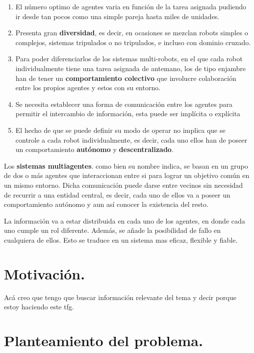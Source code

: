 \begin{enumerate}
	\item El número optimo de agentes varia en función de la tarea asignada pudiendo ir desde tan pocos como una simple pareja hasta miles de unidades.
	\item Presenta gran \textbf{diversidad}, es decir, en ocasiones se mezclan robots simples o complejos, sistemas tripulados o no tripulados, e incluso con dominio cruzado.
	\item Para poder diferenciarlos de los sistemas multi-robots, en el que cada robot individualmente tiene una tarea asignada de antemano, los de tipo enjambre han de tener un \textbf{comportamiento colectivo} que involucre colaboración entre los propios agentes y estos con su entorno.
	\item Se necesita establecer una forma de comunicación entre los agentes para permitir el intercambio de información, esta puede ser implícita o explícita
	\item El hecho de que se puede definir su modo de operar no implica que se controle a cada robot individualmente, es decir, cada uno ellos han de poseer un comportamiento \textbf{autónomo} y \textbf{descentralizado}.
\end{enumerate}

Los \textbf{sistemas multiagentes}. como bien su nombre indica, se basan en un grupo de dos o más agentes que interaccionan entre si para lograr un objetivo común en un mismo entorno. Dicha comunicación puede darse entre vecinos sin necesidad de recurrir a una entidad central, es decir, cada uno de ellos va a poseer un comportamiento autónomo y aun así conocer la existencia del resto.

La información va a estar distribuida en cada uno de los agentes, en donde cada uno cumple un rol diferente. Además, se añade la posibilidad de fallo en cualquiera de ellos. Esto se traduce en un sistema mas eficaz, flexible y fiable. 

\section{Motivación.}

Acá creo que tengo que buscar información relevante del tema y decir porque estoy haciendo este tfg.

\section{Planteamiento del problema.}

